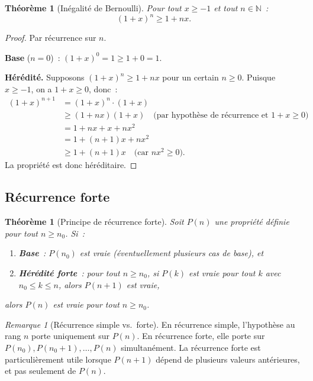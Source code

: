\documentclass[12pt,a4paper,openany]{book}
\theoremstyle{definition}
\theoremstyle{plain}
\newtheorem{theoreme}[definition]{Théorème}
\theoremstyle{remark}
\newtheorem{remarque}[definition]{Remarque}
\newcommand{\N}{\mathbb{N}}
\begin{document}
\begin{theoreme}[In\'egalit\'e de Bernoulli]\label{thm:bernoulli}
  Pour tout $x \geq -1$ et tout $n \in \N$~:
  \[
    (1 + x)^n \geq 1 + nx.
  \]
\end{theoreme}

\begin{proof}
  Par r\'ecurrence sur $n$.

  \textbf{Base} ($n = 0$)~: $(1+x)^0 = 1 \geq 1 + 0 = 1$. \checkmark

  \textbf{H\'er\'edit\'e.} Supposons $(1 + x)^n \geq 1 + nx$ pour un certain $n \geq 0$. Puisque $x \geq -1$, on a $1 + x \geq 0$, donc~:
  \begin{align*}
    (1 + x)^{n+1} &= (1 + x)^n \cdot (1 + x) \\
    &\geq (1 + nx)(1 + x) \quad\text{(par hypoth\`ese de r\'ecurrence et $1+x \geq 0$)} \\
    &= 1 + nx + x + nx^2 \\
    &= 1 + (n+1)x + nx^2 \\
    &\geq 1 + (n+1)x \quad\text{(car $nx^2 \geq 0$).}
  \end{align*}
  La propri\'et\'e est donc h\'er\'editaire.
\end{proof}

\subsection{R\'ecurrence forte}
\label{subsec:recurrence-forte}

\begin{theoreme}[Principe de r\'ecurrence forte]\label{thm:recurrence-forte}
  Soit $P(n)$ une propri\'et\'e d\'efinie pour tout $n \geq n_0$. Si~:
  \begin{enumerate}[label=(\roman*)]
    \item \textbf{Base}~: $P(n_0)$ est vraie (\'eventuellement plusieurs cas de base), et
    \item \textbf{H\'er\'edit\'e forte}~: pour tout $n \geq n_0$, si $P(k)$ est vraie pour tout $k$ avec $n_0 \leq k \leq n$, alors $P(n+1)$ est vraie,
  \end{enumerate}
  alors $P(n)$ est vraie pour tout $n \geq n_0$.
\end{theoreme}

\begin{remarque}[R\'ecurrence simple vs.\ forte]\label{rem:rec-simple-forte}
  En r\'ecurrence simple, l'hypoth\`ese au rang $n$ porte uniquement sur $P(n)$. En r\'ecurrence forte, elle porte sur $P(n_0), P(n_0+1), \dots, P(n)$ simultan\'ement. La r\'ecurrence forte est particuli\`erement utile lorsque $P(n+1)$ d\'epend de plusieurs valeurs ant\'erieures, et pas seulement de $P(n)$.
\end{remarque}
\end{document}
